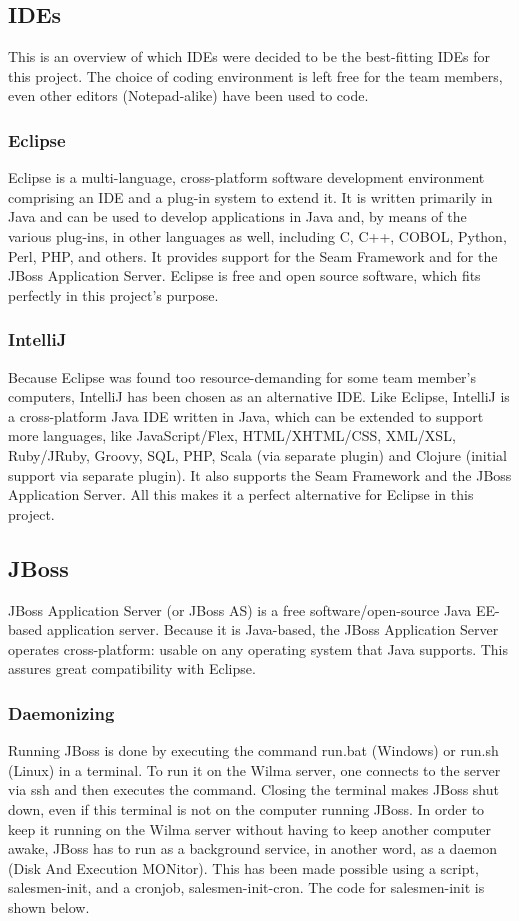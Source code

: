 \subsection{IDEs}
This is an overview of which IDEs were decided to be the best-fitting IDEs for this project. The choice of coding environment is left free for the team members, even other editors (Notepad-alike) have been used to code.
\subsubsection{Eclipse}
Eclipse is a multi-language, cross-platform software development environment comprising an IDE and a plug-in system to extend it.
It is written primarily in Java and can be used to develop applications in Java and, by means of the various plug-ins, in other languages as well, including C, C++, COBOL, Python, Perl, PHP, and others.
It provides support for the Seam Framework and for the JBoss Application Server.
Eclipse is free and open source software, which fits perfectly in this project's purpose.
\subsubsection{IntelliJ}
Because Eclipse was found too resource-demanding for some team member's computers, IntelliJ has been chosen as an alternative IDE.
Like Eclipse, IntelliJ is a cross-platform Java IDE written in Java, which can be extended to support more languages, like JavaScript/Flex, HTML/XHTML/CSS, XML/XSL, Ruby/JRuby, Groovy, SQL, PHP, Scala (via separate plugin) and Clojure (initial support via separate plugin).
It also supports the Seam Framework and the JBoss Application Server.
All this makes it a perfect alternative for Eclipse in this project.

\subsection{JBoss}
JBoss Application Server (or JBoss AS) is a free software/open-source Java EE-based application server.
Because it is Java-based, the JBoss Application Server operates cross-platform: usable on any operating system that Java supports.
This assures great compatibility with Eclipse.
\subsubsection{Daemonizing}
Running JBoss is done by executing the command run.bat (Windows) or run.sh (Linux) in a terminal.
To run it on the Wilma server, one connects to the server via ssh and then executes the command.
Closing the terminal makes JBoss shut down, even if this terminal is not on the computer running JBoss.
In order to keep it running on the Wilma server without having to keep another computer awake, JBoss has to run as a background service, in another word, as a daemon (Disk And Execution MONitor).
This has been made possible using a script, salesmen-init, and a cronjob, salesmen-init-cron.
The code for salesmen-init is shown below.

